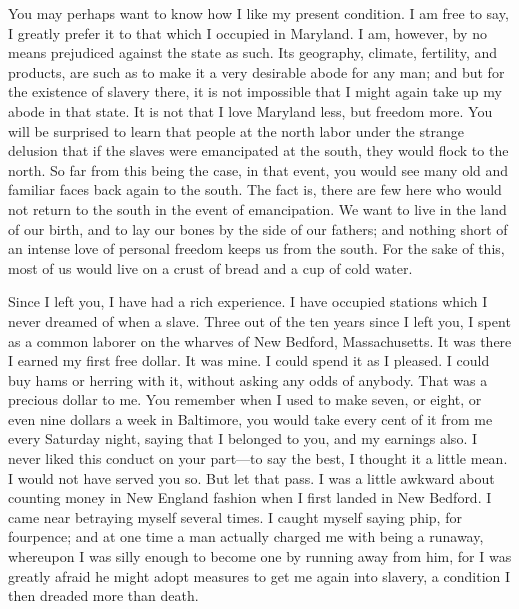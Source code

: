 You may perhaps want to know how I like my present condition. I am free
to say, I greatly prefer it to that which I occupied in Maryland. I am,
however, by no means prejudiced against the state as such. Its
geography, climate, fertility, and products, are such as to make it a
very desirable abode for any man; and but for the existence of slavery
there, it is not impossible that I might again take up my abode in that
state. It is not that I love Maryland less, but freedom more. You will
be surprised to learn that people at the north labor under the strange
delusion that if the slaves were emancipated at the south, they would
flock to the north. So far from this being the case, in that event, you
would see many old and familiar faces back again to the south. The fact
is, there are few here who would not return to the south in the event of
emancipation. We want to live in the land of our birth, and to lay our
bones by the side of our fathers; and nothing short of an intense love
of personal freedom keeps us from the south. For the sake of this, most
of us would live on a crust of bread and a cup of cold water.

Since I left you, I have had a rich experience. I have occupied stations
which I never dreamed of when a slave. Three out of the ten years since
I left you, I spent as a common laborer on the wharves of New Bedford,
Massachusetts. It was there I earned my first free dollar. It was mine.
I could spend it as I pleased. I could buy hams or herring with it,
without asking any odds of anybody. That was a precious dollar to me.
You remember when I used to make seven, or eight, or even nine dollars a
week in Baltimore, you would take every cent of it from me every
Saturday night, saying that I belonged to you, and my earnings also. I
never liked this conduct on your part---to say the best, I thought it a
little mean. I would not have served you so. But let that pass. I was a
little awkward about counting money in New England fashion when I first
landed in New Bedford. I came near betraying myself several times. I
caught myself saying phip, for fourpence; and at one time a man actually
charged me with being a runaway, whereupon I was silly enough to become
one by running away from him, for I was greatly afraid he might adopt
{}measures to get me again into slavery, a condition I then dreaded more
than death.

